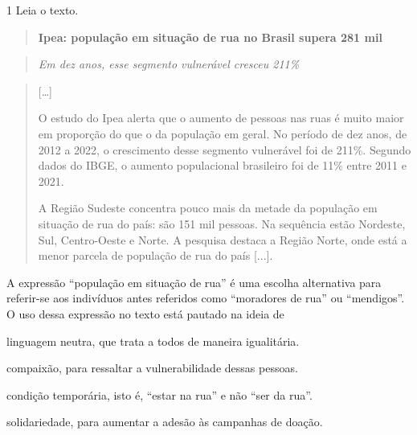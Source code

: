 

\num{1} Leia o texto.

\begin{quote}
\textbf{Ipea: população em situação de rua no Brasil supera 281 mil}
\end{quote}

\begin{quote}
\emph{Em dez anos, esse segmento vulnerável cresceu 211\%}
\end{quote}

\begin{quote}
{[}\ldots{]}

O estudo do Ipea alerta que o aumento de pessoas nas ruas é muito maior
em proporção do que o da população em geral. No período de dez anos, de
2012 a 2022, o crescimento desse segmento vulnerável foi de 211\%.
Segundo dados do IBGE, o aumento populacional brasileiro foi de 11\%
entre 2011 e 2021.

A Região Sudeste concentra pouco mais da metade da população em situação
de rua do país: são 151 mil pessoas. Na sequência estão Nordeste, Sul,
Centro-Oeste e Norte. A pesquisa destaca a Região Norte, onde está a
menor parcela de população de rua do país {[}...{]}.
\end{quote}


A expressão ``população em situação de rua'' é uma escolha alternativa
para referir-se aos indivíduos antes referidos como ``moradores de rua''
ou ``mendigos''. O uso dessa expressão no texto está pautado na ideia de

\begin{escolha}

\item linguagem neutra, que trata a todos de maneira igualitária.

\item compaixão, para ressaltar a vulnerabilidade dessas pessoas.

\item condição temporária, isto é, ``estar na rua'' e não ``ser da rua''.

\item solidariedade, para aumentar a adesão às campanhas de doação.

\end{escolha}

